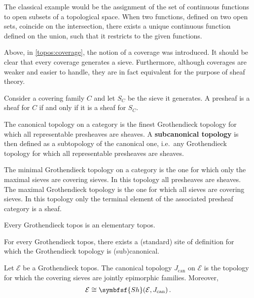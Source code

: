 \begin{example}
        The classical example would be the assignment of the set of continuous functions to open subsets of a topological space. When two functions, defined on two open sets, coincide on the intersection, there exists a unique continuous function defined on the union, such that it restricts to the given functions.
    \end{example}

    Above, in \cref{topos:coverage}, the notion of a coverage was introduced. It should be clear that every coverage generates a sieve. Furthermore, although coverages are weaker and easier to handle, they are in fact equivalent for the purpose of sheaf theory.
    \begin{property}
        Consider a covering family $C$ and let $S_C$ be the sieve it generates. A presheaf is a sheaf for $C$ if and only if it is a sheaf for $S_C$.
    \end{property}

    \begin{example}
        The canonical topology on a category is the finest Grothendieck topology for which all representable presheaves are sheaves. A \textbf{subcanonical topology} is then defined as a subtopology of the canonical one, i.e.~any Grothendieck topology for which all representable presheaves are sheaves.
    \end{example}
    \begin{example}
        The minimal Grothendieck topology on a category is the one for which only the maximal sieves are covering sieves. In this topology all presheaves are sheaves. The maximal Grothendieck topology is the one for which all sieves are covering sieves. In this topology only the terminal element of the associated presheaf category is a sheaf.
    \end{example}

    \begin{property}
        Every Grothendieck topos is an elementary topos.
    \end{property}

    \begin{property}
        For every Grothendieck topos, there exists a (standard) site of definition for which the Grothendieck topology is (sub)canonical.
    \end{property}
    \begin{property}
        Let $\mathcal{E}$ be a Grothendieck topos. The canonical topology $J_{\text{can}}$ on $\mathcal{E}$ is the topology for which the covering sieves are jointly epimorphic families. Moreover,
        \begin{gather}
            \mathcal{E}\cong\symbfsf{Sh}(\mathcal{E},J_{\text{can}})\,.
        \end{gather}
    \end{property}

